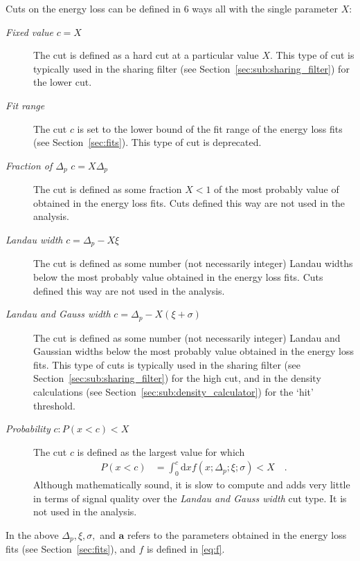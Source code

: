 \documentclass[compat,11pt]{alicenote}
\newcommand{\secref}[1]{Section~\ref{#1}}
\newcommand\FIXME[1]{\marginpar{\raggedright\textbf{FIXME:} #1}}
\begin{document}
\FIXME{Possibly some plots}
Cuts on the energy loss can be defined in 6 ways all with the single
parameter $X$:
\begin{description}
\item[\emph{Fixed value} $c=X$]
  The cut is defined as a hard cut at a particular value $X$.  This
  type of cut is typically used in the sharing filter (see
  \secref{sec:sub:sharing_filter}) for the lower cut.
\item[\emph{Fit range}]
  The cut $c$ is set to the lower bound of the fit range of the energy
  loss fits (see \secref{sec:fits}).  This type of cut is deprecated.
\item[\emph{Fraction of $\Delta_p$} $c=X\Delta_p$] The cut is defined
  as some fraction $X<1$ of the most probably value of obtained in
  the energy loss fits.  Cuts defined this way are not used in the
  analysis. 
\item[\emph{Landau width} $c=\Delta_p-X\xi$] The cut is defined as
  some number (not necessarily integer) Landau widths below the most
  probably value obtained in the energy loss fits. Cuts defined this
  way are not used in the analysis. 
\item[\emph{Landau and Gauss width} $c=\Delta_p - X(\xi+\sigma)$] The
  cut is defined as some number (not necessarily integer) Landau and
  Gaussian widths below the most probably value obtained in the energy
  loss fits. This type of cuts is typically used in the sharing filter
  (see \secref{sec:sub:sharing_filter}) for the high cut, and in the
  density calculations (see \secref{sec:sub:density_calculator}) for
  the `hit' threshold.
\item[\emph{Probability} $c:P(x<c)<X$] The cut $c$ is defined as
  the largest value for which 
  \begin{align*}
    P(x<c) &= \int_0^c\text{d}x f(x;\Delta_p;\xi;\sigma) < X\quad.
  \end{align*}
  Although mathematically sound, it is slow to compute and adds very
  little in terms of signal quality over the \emph{Landau and Gauss
    width}  cut type.  It is not used in the analysis.
\end{description}
In the above $\Delta_p,\xi,\sigma,$ and $\mathbf{a}$ refers to the
parameters obtained in the energy loss fits (see \secref{sec:fits}),
and $f$ is defined in \eqref{eq:f}.
\end{document}
